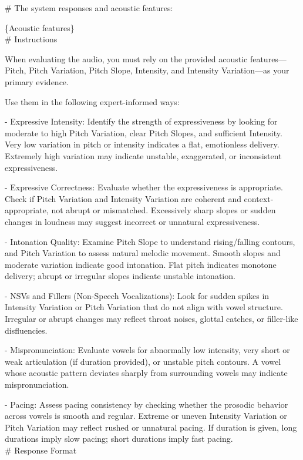 \begin{tcolorbox}[gray_box, title = {{Prompt Template: Synthesizing Utterence-level Evidence Log}}]
\# The system responses and acoustic features:

\{Acoustic features\} \\

\# Instructions

When evaluating the audio, you must rely on the provided acoustic features—Pitch, Pitch Variation, Pitch Slope, Intensity, and Intensity Variation—as your primary evidence. 

Use them in the following expert-informed ways:

- Expressive Intensity: Identify the strength of expressiveness by looking for moderate to high Pitch Variation, clear Pitch Slopes, and sufficient Intensity. Very low variation in pitch or intensity indicates a flat, emotionless delivery. Extremely high variation may indicate unstable, exaggerated, or inconsistent expressiveness.

- Expressive Correctness: Evaluate whether the expressiveness is appropriate. Check if Pitch Variation and Intensity Variation are coherent and context-appropriate, not abrupt or mismatched. Excessively sharp slopes or sudden changes in loudness may suggest incorrect or unnatural expressiveness.

- Intonation Quality: Examine Pitch Slope to understand rising/falling contours, and Pitch Variation to assess natural melodic movement. Smooth slopes and moderate variation indicate good intonation. Flat pitch indicates monotone delivery; abrupt or irregular slopes indicate unstable intonation.

- NSVs and Fillers (Non-Speech Vocalizations): Look for sudden spikes in Intensity Variation or Pitch Variation that do not align with vowel structure. Irregular or abrupt changes may reflect throat noises, glottal catches, or filler-like disfluencies.

- Mispronunciation: Evaluate vowels for abnormally low intensity, very short or weak articulation (if duration provided), or unstable pitch contours. A vowel whose acoustic pattern deviates sharply from surrounding vowels may indicate mispronunciation.

- Pacing: Assess pacing consistency by checking whether the prosodic behavior across vowels is smooth and regular. Extreme or uneven Intensity Variation or Pitch Variation may reflect rushed or unnatural pacing. If duration is given, long durations imply slow pacing; short durations imply fast pacing. \\

\# Response Format


\end{tcolorbox}

